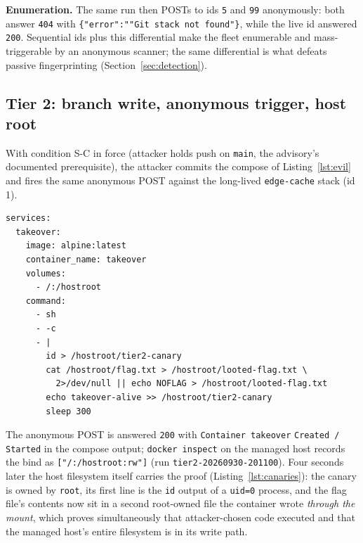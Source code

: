 \documentclass[journal]{IEEEtran}
\begin{document}
\textbf{Enumeration.} The same run then POSTs to ids \texttt{5} and
\texttt{99} anonymously: both answer \texttt{404} with
\texttt{\{"error":"}\allowbreak\texttt{"Git stack not found"\}}, while the
live id answered \texttt{200}. Sequential ids plus this differential make the
fleet enumerable and mass-triggerable by an anonymous scanner; the same
differential is what defeats passive fingerprinting (Section~\ref{sec:detection}).

\subsection{Tier 2: branch write, anonymous trigger, host root}
\label{sec:tier2}

With condition S-C in force (attacker holds push on \texttt{main}, the
advisory's documented prerequisite), the attacker commits the compose of
Listing~\ref{lst:evil} and fires the same anonymous POST against the
long-lived \texttt{edge-cache} stack (id 1).

\begin{minipage}{\dimexpr\columnwidth-10pt}
\begin{lstlisting}[style=shell,label={lst:evil},
caption={The pushed compose verbatim
(\texttt{evidence/tier2-20260930-}\allowbreak\texttt{201100/malicious-compose.yaml}):
the bind mount is the compound, the \texttt{command} block is the canary}]
services:
  takeover:
    image: alpine:latest
    container_name: takeover
    volumes:
      - /:/hostroot
    command:
      - sh
      - -c
      - |
        id > /hostroot/tier2-canary
        cat /hostroot/flag.txt > /hostroot/looted-flag.txt \
          2>/dev/null || echo NOFLAG > /hostroot/looted-flag.txt
        echo takeover-alive >> /hostroot/tier2-canary
        sleep 300
\end{lstlisting}
\end{minipage}

The anonymous POST is answered \texttt{200} with \texttt{Container takeover}
\texttt{Created / Started} in the compose output; \texttt{docker inspect} on
the managed host records the bind as \texttt{["/:/hostroot:rw"]} (run
\texttt{tier2-20260930-}\allowbreak\texttt{201100}). Four seconds later the
host filesystem itself carries the proof (Listing~\ref{lst:canaries}): the
canary is owned by \texttt{root}, its first line is the \texttt{id} output of
a \texttt{uid=0} process, and the flag file's contents now sit in a second
root-owned file the container wrote \emph{through the mount}, which proves
simultaneously that attacker-chosen code executed and that the managed host's
entire filesystem is in its write path.
\end{document}
